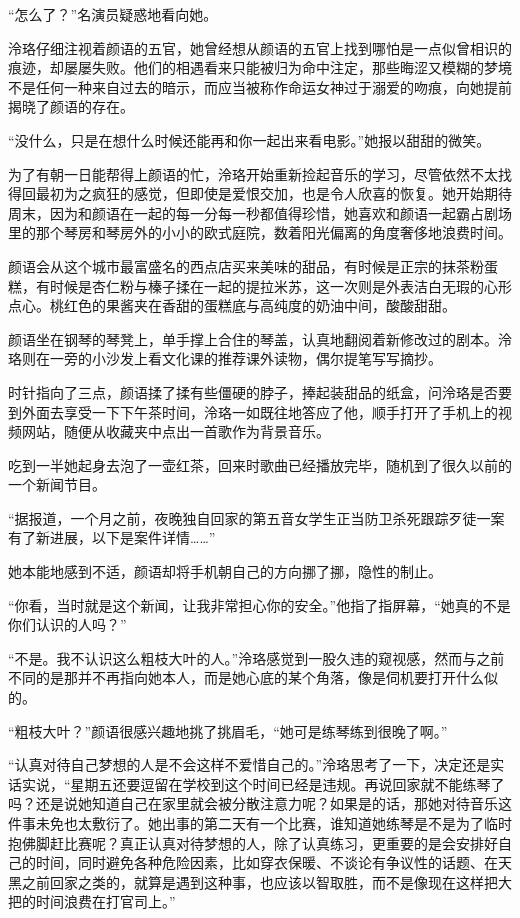 \documentclass[UTF8, scheme = chinese, openany]{ctexbook}
\begin{document}
“怎么了？”名演员疑惑地看向她。

泠珞仔细注视着颜语的五官，她曾经想从颜语的五官上找到哪怕是一点似曾相识的痕迹，却屡屡失败。他们的相遇看来只能被归为命中注定，那些晦涩又模糊的梦境不是任何一种来自过去的暗示，而应当被称作命运女神过于溺爱的吻痕，向她提前揭晓了颜语的存在。

“没什么，只是在想什么时候还能再和你一起出来看电影。”她报以甜甜的微笑。

\vspace{1.5em}

为了有朝一日能帮得上颜语的忙，泠珞开始重新捡起音乐的学习，尽管依然不太找得回最初为之疯狂的感觉，但即使是爱恨交加，也是令人欣喜的恢复。她开始期待周末，因为和颜语在一起的每一分每一秒都值得珍惜，她喜欢和颜语一起霸占剧场里的那个琴房和琴房外的小小的欧式庭院，数着阳光偏离的角度奢侈地浪费时间。

颜语会从这个城市最富盛名的西点店买来美味的甜品，有时候是正宗的抹茶粉蛋糕，有时候是杏仁粉与榛子揉在一起的提拉米苏，这一次则是外表洁白无瑕的心形点心。桃红色的果酱夹在香甜的蛋糕底与高纯度的奶油中间，酸酸甜甜。

颜语坐在钢琴的琴凳上，单手撑上合住的琴盖，认真地翻阅着新修改过的剧本。泠珞则在一旁的小沙发上看文化课的推荐课外读物，偶尔提笔写写摘抄。

时针指向了三点，颜语揉了揉有些僵硬的脖子，捧起装甜品的纸盒，问泠珞是否要到外面去享受一下下午茶时间，泠珞一如既往地答应了他，顺手打开了手机上的视频网站，随便从收藏夹中点出一首歌作为背景音乐。

吃到一半她起身去泡了一壶红茶，回来时歌曲已经播放完毕，随机到了很久以前的一个新闻节目。

“据报道，一个月之前，夜晚独自回家的第五音女学生正当防卫杀死跟踪歹徒一案有了新进展，以下是案件详情……”

她本能地感到不适，颜语却将手机朝自己的方向挪了挪，隐性的制止。

“你看，当时就是这个新闻，让我非常担心你的安全。”他指了指屏幕，“她真的不是你们认识的人吗？”

“不是。我不认识这么粗枝大叶的人。”泠珞感觉到一股久违的窥视感，然而与之前不同的是那并不再指向她本人，而是她心底的某个角落，像是伺机要打开什么似的。

“粗枝大叶？”颜语很感兴趣地挑了挑眉毛，“她可是练琴练到很晚了啊。”

“认真对待自己梦想的人是不会这样不爱惜自己的。”泠珞思考了一下，决定还是实话实说，“星期五还要逗留在学校到这个时间已经是违规。再说回家就不能练琴了吗？还是说她知道自己在家里就会被分散注意力呢？如果是的话，那她对待音乐这件事未免也太敷衍了。她出事的第二天有一个比赛，谁知道她练琴是不是为了临时抱佛脚赶比赛呢？真正认真对待梦想的人，除了认真练习，更重要的是会安排好自己的时间，同时避免各种危险因素，比如穿衣保暖、不谈论有争议性的话题、在天黑之前回家之类的，就算是遇到这种事，也应该以智取胜，而不是像现在这样把大把的时间浪费在打官司上。”
\end{document}
